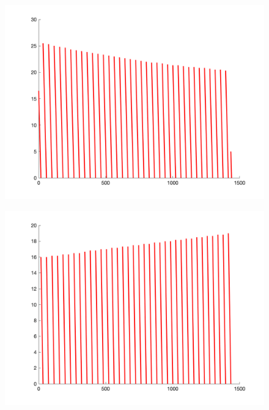 \documentclass[withoutpreface,bwprint]{cumcmthesis} %
\begin{document}
\begin{figure}[H]
\begin{minipage}[c]{0.35\textwidth}
        \includegraphics[width=1\textwidth]{figures/2-2-10-up.png}
    \label{fig:my_label}
    \end{minipage}
\begin{minipage}[c]{0.35\textwidth}
    \includegraphics[width=1\textwidth]{figures/2-2-10-down.png}
    \label{fig:my_label}
\end{minipage}
     \begin{minipage}[c]{0.35\textwidth}

\end{minipage}
\end{figure}
\end{document}
